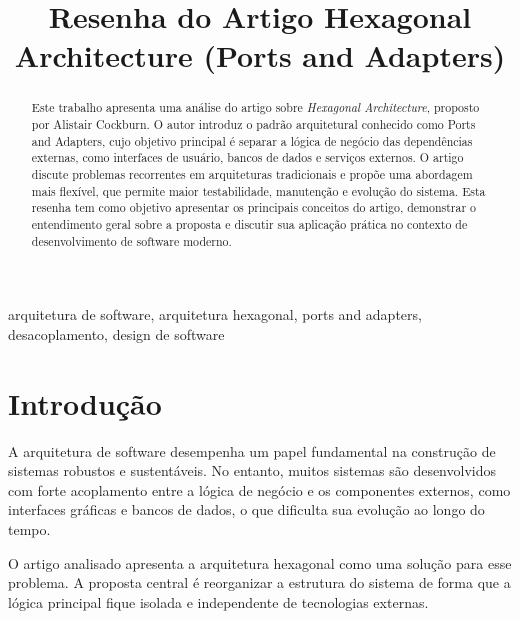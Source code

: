 \documentclass[conference]{IEEEtran}
\begin{document}
\title{Resenha do Artigo Hexagonal Architecture (Ports and Adapters)}

\author{
}

\maketitle

\begin{abstract}

Este trabalho apresenta uma análise do artigo sobre \textit{Hexagonal Architecture}, proposto por Alistair Cockburn. O autor introduz o padrão arquitetural conhecido como Ports and Adapters, cujo objetivo principal é separar a lógica de negócio das dependências externas, como interfaces de usuário, bancos de dados e serviços externos. O artigo discute problemas recorrentes em arquiteturas tradicionais e propõe uma abordagem mais flexível, que permite maior testabilidade, manutenção e evolução do sistema. Esta resenha tem como objetivo apresentar os principais conceitos do artigo, demonstrar o entendimento geral sobre a proposta e discutir sua aplicação prática no contexto de desenvolvimento de software moderno.

\end{abstract}

\begin{IEEEkeywords}
arquitetura de software, arquitetura hexagonal, ports and adapters, desacoplamento, design de software
\end{IEEEkeywords}

\section{Introdução}

A arquitetura de software desempenha um papel fundamental na construção de sistemas robustos e sustentáveis. No entanto, muitos sistemas são desenvolvidos com forte acoplamento entre a lógica de negócio e os componentes externos, como interfaces gráficas e bancos de dados, o que dificulta sua evolução ao longo do tempo.

O artigo analisado apresenta a arquitetura hexagonal como uma solução para esse problema. A proposta central é reorganizar a estrutura do sistema de forma que a lógica principal fique isolada e independente de tecnologias externas.
\end{document}
